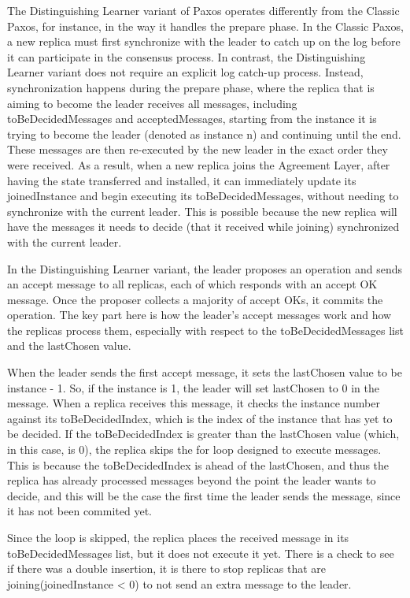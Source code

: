 \documentclass[sigconf]{acmart}
\begin{document}
The Distinguishing Learner variant of Paxos operates differently from the Classic Paxos, for instance, in the way it handles the prepare phase. In the Classic Paxos, a new replica must first synchronize with the leader to catch up on the log before it can participate in the consensus process. In contrast, the Distinguishing Learner variant does not require an explicit log catch-up process. Instead, synchronization happens during the prepare phase, where the replica that is aiming to become the leader receives all messages, including toBeDecidedMessages and acceptedMessages, starting from the instance it is trying to become the leader (denoted as instance n) and continuing until the end.
These messages are then re-executed by the new leader in the exact order they were received. As a result, when a new replica joins the Agreement Layer, after having the state transferred and installed, it can immediately update its joinedInstance and begin executing its toBeDecidedMessages, without needing to synchronize with the current leader. This is possible because the new replica will have the messages it needs to decide (that it received while joining) synchronized with the current leader.

In the Distinguishing Learner variant, the leader proposes an operation and sends an accept message to all replicas, each of which responds with an accept OK message. Once the proposer collects a majority of accept OKs, it commits the operation. The key part here is how the leader's accept messages work and how the replicas process them, especially with respect to the toBeDecidedMessages list and the lastChosen value.

When the leader sends the first accept message, it sets the lastChosen value to be instance - 1. So, if the instance is 1, the leader will set lastChosen to 0 in the message. When a replica receives this message, it checks the instance number against its toBeDecidedIndex, which is the index of the instance that has yet to be decided. If the toBeDecidedIndex is greater than the lastChosen value (which, in this case, is 0), the replica skips the for loop designed to execute messages. This is because the toBeDecidedIndex is ahead of the lastChosen, and thus the replica has already processed messages beyond the point the leader wants to decide, and this will be the case the first time the leader sends the message, since it has not been commited yet.

Since the loop is skipped, the replica places the received message in its toBeDecidedMessages list, but it does not execute it yet. There is a check to see if there was a double insertion, it is there to stop replicas that are joining(joinedInstance < 0) to not send an extra message to the leader. 
\end{document}

